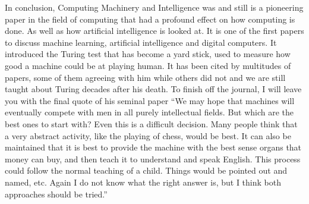 \documentclass{article}
\begin{document}
In conclusion, Computing Machinery and Intelligence was and still is a pioneering paper in the field of computing that had a 
profound effect on how computing is done. As well as how artificial intelligence is looked at. It is one of the first papers 
to discuss machine learning, artificial intelligence and digital computers. It introduced the Turing test that has become a 
yard stick, used to measure  how good a machine could be at playing human. It has been cited by multitudes of papers, some of 
them agreeing with him while others did not and we are still taught about Turing decades after his death. To finish off the 
journal, I will leave you with the final quote of his seminal paper “We may hope that machines will eventually compete with 
men in all purely intellectual fields. But which are the best ones to start with? Even this is a difficult decision. Many 
people think that a very abstract activity, like the playing of chess, would be best. It can also be maintained that it is 
best to provide the machine with the best sense organs that money can buy, and then teach it to understand and speak English. 
This process could follow the normal teaching of a child. Things would be pointed out and named, etc. Again I do not know what 
the right answer is, but I think both approaches should be tried.”











\end{document}
